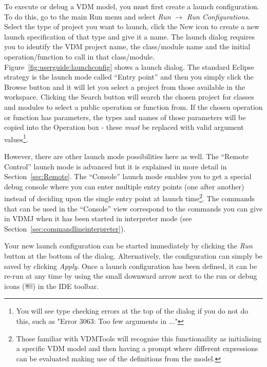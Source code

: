 \documentclass{overturerepchap}
\begin{document}
To execute or debug a VDM model, you must first create a launch
configuration. To do this, go to the main Run menu
and select \emph{Run} $\rightarrow $ \emph{Run Configurations}. Select the type of
project you want to launch, click the New icon to
create a new launch specification of that type and give it a name. The
launch dialog requires you to identify the VDM project name,
the class/module name and the initial operation/function to call in that
class/module. Figure~\ref{fig:userguide:launchconfig} shows a launch
dialog. The standard Eclipse strategy is the launch mode called
``Entry point'' and then you simply click 
the Browse button and it will let you select a project from
those available in the workspace. Clicking the Search button will search the chosen
project for classes and modules to select a public operation or function from.
If the chosen operation or function has parameters, the types and names of those
parameters will be copied into the Operation box - these \emph{must} be replaced with
valid argument values\footnote{You will see type checking errors at the top of the
dialog if you do not do this, such as "Error 3063: Too few arguments in ..."}.

However, there are other launch mode possibilities here as
well. The
``Remote Control'' launch mode is advanced but it is explained in more
detail in Section~\ref{sec:Remote}. The ``Console'' launch mode
enables you to get a special debug console where you can enter
multiple entry points (one after another) instead of deciding upon the
single entry point at launch time\footnote{Those familiar with
  VDMTools will recognise this functionaility as initialising a
  specific VDM model and then having a prompt where different
  expressions can be evaluated making use of the definitions from the model.}.
The commands that can be used in the ``Console'' view correspond to
the commands you can give in VDMJ when it has been started in
interpreter mode (see Section~\ref{sec:commandlineinterpreter}).

Your new launch configuration can be started immediately by clicking the \emph{Run}
button at the bottom of the dialog. Alternatively, the configuration can simply be
saved by clicking \emph{Apply}. Once a launch configuration has been defined, it
can be re-run at any time by using the small downward arrow next to the run or
debug icons (\includegraphics[width=0.03\textwidth]{icons/debuggericon})
in the IDE toolbar.
\end{document}
